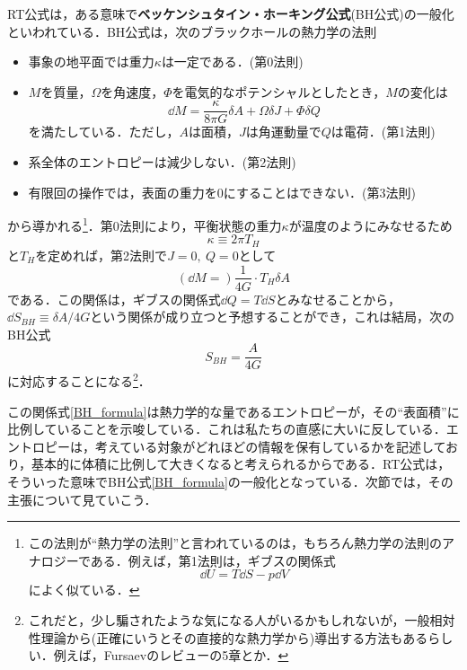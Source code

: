 \documentclass[a4paper,uplatex,dvipdfmx]{jsarticle}
\theoremstyle{definition}
\begin{document}
RT公式は，ある意味で\textbf{ベッケンシュタイン・ホーキング公式}(BH公式)の一般化といわれている．BH公式は，次のブラックホールの熱力学の法則\cite{Bardeen_FourLaws_1973}
\begin{itemize}
  \item 
  事象の地平面では重力$\kappa$は一定である．(第0法則)
  \item 
  $M$を質量，$\Omega$を角速度，$\Phi$を電気的なポテンシャルとしたとき，$M$の変化は
  \begin{equation}
    \dd M
    =
    \frac{\kappa}{8\pi G}\delta A
    +
    \Omega\delta J
    +
    \Phi\delta Q
  \end{equation}
  を満たしている．ただし，$A$は面積，$J$は角運動量で$Q$は電荷．(第1法則)
  \item 
  系全体のエントロピーは減少しない．(第2法則)
  \item 
  有限回の操作では，表面の重力を0にすることはできない．(第3法則)
\end{itemize}
から導かれる\footnote{
  この法則が``熱力学の法則''と言われているのは，もちろん熱力学の法則のアナロジーである．例えば，第1法則は，ギブスの関係式
  $$
    \dd U
    =
    T\dd S
    -
    p\dd V
  $$
  によく似ている．
}．第0法則により，平衡状態の重力$\kappa$が温度のようにみなせるため
\begin{equation}
  \kappa
  \equiv
  2\pi T_{H}
\end{equation}
と$T_{H}$を定めれば，第2法則で$J=0,\ Q=0$として
\begin{equation}
  (\dd M
  =)
  \frac{1}{4G}\cdot T_{H}\delta A
\end{equation}
である．この関係は，ギブスの関係式$\dd Q=T\dd S$とみなせることから，$\dd S_{BH}\equiv \delta A/4G$という関係が成り立つと予想することができ，これは結局，次のBH公式
\begin{equation}
  S_{BH}
  =
  \frac{A}{4G}
  \label{BH_formula}
\end{equation}
に対応することになる\footnote{
  これだと，少し騙されたような気になる人がいるかもしれないが，一般相対性理論から(正確にいうとその直接的な熱力学から)導出する方法もあるらしい．例えば，Fursaevのレビュー\cite{Fursaev_BlackHole_2022}の5章とか．
}．

この関係式\eqref{BH_formula}は熱力学的な量であるエントロピーが，その``表面積''に比例していることを示唆している．これは私たちの直感に大いに反している．エントロピーは，考えている対象がどれほどの情報を保有しているかを記述しており，基本的に体積に比例して大きくなると考えられるからである．RT公式は，そういった意味でBH公式\eqref{BH_formula}の一般化となっている．次節では，その主張について見ていこう．
\end{document}
